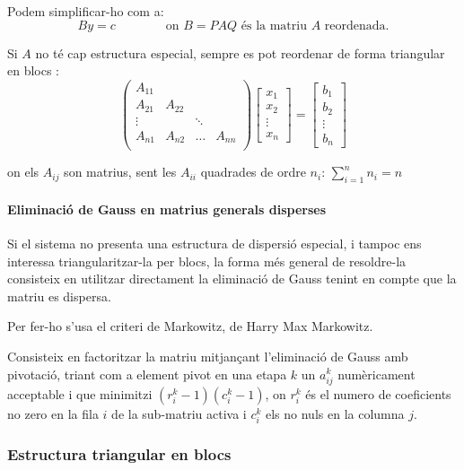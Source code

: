 \documentclass[11pt,a4paper,twoside]{report}
\begin{document}
Podem simplificar-ho com a:
\[By = c \qquad \qquad \text{on $B = PAQ$ és la matriu $A$ reordenada.} \]

Si $A$ no té cap estructura especial, sempre es pot reordenar de forma triangular en blocs : 
\[
\begin{pmatrix}
A_{11}	\\
A_{21}	&	A_{22}	\\
\vdots		&	& \ddots	&	\\
A_{n1}	&	A_{n2}	&	\dots	&	A_{nn}	\\
\end{pmatrix}
\begin{bmatrix}
x_1 \\ x_2 \\ \vdots \\ x_n
\end{bmatrix}
=
\begin{bmatrix}
b_1 \\ b_2 \\ \vdots \\ b_n
\end{bmatrix}
\]

on els $A_{ij}$ son matrius, sent les $A_{ii}$ quadrades de ordre $n_i$: $\sum_{i = 1}^n n_i = n$

\paragraph*{Eliminació de Gauss en matrius generals disperses} \mbox{}

Si el sistema no presenta una estructura de dispersió especial, i tampoc ens interessa triangularitzar-la per blocs, la forma més general de resoldre-la consisteix en utilitzar directament la eliminació de Gauss tenint en compte que la matriu es dispersa.

Per fer-ho s'usa el criteri de Markowitz, de Harry Max Markowitz.

Consisteix en factoritzar la matriu mitjançant l'eliminació de Gauss amb pivotació, triant com a element pivot en una etapa $k$ un $a_{ij}^k$ numèricament acceptable i que minimitzi $(r_i^k - 1)(c_i^k - 1)$, on $r_i^k$ és el numero de coeficients no zero en la fila $i$ de la sub-matriu activa i $c_i^k$ els no nuls en la columna $j$.

\subsubsection{Estructura triangular en blocs}
\end{document}
